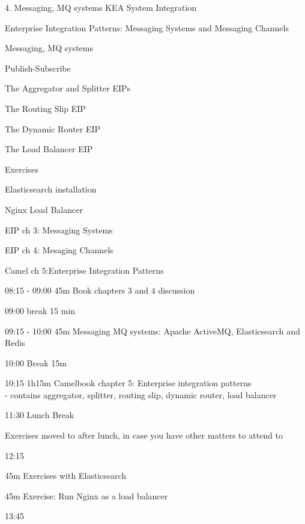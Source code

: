\documentclass[Screen16to9,17pt]{foils}
\begin{document}
\mytitlepage
{4. Messaging, MQ systems}
{KEA System Integration}


\begin{list2}
\item Enterprise Integration Patterns: Messaging Systems and Messaging Channels
\item Messaging, MQ systems
\item Publish-Subscribe
\item The Aggregator and Splitter EIPs
\item The Routing Slip EIP
\item The Dynamic Router EIP
\item The Load Balancer EIP
\end{list2}

Exercises
\begin{list2}
\item Elasticsearch installation
\item Nginx Load Balancer
\end{list2}




\begin{list1}
\item EIP ch 3: Messaging Systems
\item EIP ch 4: Mesaging Channels
\item Camel ch 5:Enterprise Integration Patterns

\end{list1}



\begin{list2}
\item 08:15 - 09:00 45m Book chapters 3 and 4 discussion
\item 09:00 break 15 min
\item 09:15 - 10:00 45m Messaging MQ systems: Apache ActiveMQ, Elasticsearch and Redis
\item 10:00 Break 15m
\item 10:15 1h15m Camelbook chapter 5: Enterprise integration patterns\\
 - contains aggregator, splitter, routing slip, dynamic router, load balancer
\item 11:30 Lunch Break

\item Exercises moved to after lunch, in case you have other matters to attend to
\item 12:15
\item 45m Exercises with Elasticsearch
\item 45m Exercise: Run Nginx as a load balancer
\item 13:45 
\end{list2}
\end{document}
